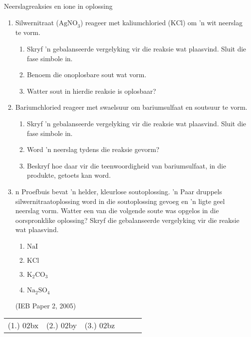 \begin{exercises}{Neerslagreaksies en ione in oplossing}
{
\nopagebreak
\begin{enumerate}[noitemsep, label=\textbf{\arabic*}. ]
\item Silwernitraat (${\text{AgNO}}_{3}$) reageer met kaliumchloried ($\text{KCl}$) om 'n wit neerslag te vorm.
    \begin{enumerate}[noitemsep, label=\textbf{\alph*}. ] 
    \item Skryf 'n gebalanseerde vergelyking vir die reaksie wat plaasvind. Sluit die fase simbole in. 
    \item Benoem die onoplosbare sout wat vorm.
    \item Watter sout in hierdie reaksie is oplosbaar?
    \end{enumerate}
\item Bariumchloried reageer met swaelsuur om bariumsulfaat en soutsuur te vorm. 
    \begin{enumerate}[noitemsep, label=\textbf{\alph*}. ] 
    \item Skryf 'n gebalanseerde vergelyking vir die reaksie wat plaasvind. Sluit die fase simbole in.
    \item Word 'n neerslag tydens die reaksie gevorm?
    \item Beskryf hoe daar vir die teenwoordigheid van bariumsulfaat, in die produkte, getoets kan word. 
    \end{enumerate}
\item n Proefbuis bevat  'n helder, kleurlose soutoplossing.  'n Paar druppels silwernitraatoplossing word in die soutoplossing gevoeg en 'n ligte geel neerslag vorm. Watter een van die volgende soute was opgelos in die oorspronklike oplossing? Skryf die gebalanseerde 	vergelyking vir die reaksie wat plaasvind.
    \begin{enumerate}[noitemsep, label=\textbf{\alph*}. ] 
    \item $\text{NaI}$
    \item $\text{KCl}$
    \item ${\text{K}}_{2}{\text{CO}}_{3}$\label{m38719*uid86}\item ${\text{Na}}_{2}{\text{SO}}_{4}$\end{enumerate}
(IEB Paper 2, 2005)\newline
    \end{enumerate}

\practiceinfo
 \par \begin{tabular}[h]{cccccc}
 (1.) 02bx  &  (2.) 02by  &  (3.) 02bz  & \end{tabular}
}
\end{exercises}

